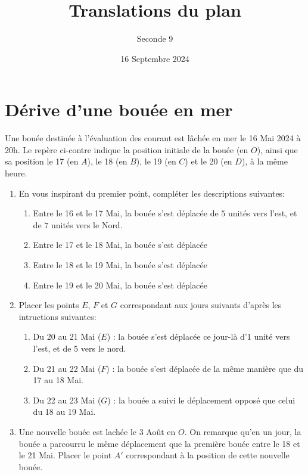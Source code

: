 \documentclass{article}
\title{Translations du plan}
\date{16 Septembre 2024}
\author{Seconde 9}
\begin{document}
\maketitle
\section*{Dérive d'une bouée en mer}
Une bouée destinée à l'évaluation des courant est lâchée en mer le 16 Mai 2024 à 20h. Le repère ci-contre indique la position initiale de la bouée (en $O$), ainsi que sa position le 17 (en $A$), le 18 (en $B$), le 19 (en $C$) et le 20 (en $D$), à la même heure. 
\begin{center}
\end{center}
\begin{enumerate}[label=\emph{\alph*)}]
\item En vous inspirant du premier point, compléter les descriptions suivantes:
\begin{enumerate}[label=\arabic*.]
\item Entre le 16 et le 17 Mai, la bouée s'est déplacée de $5$ unités vers l'est, et de $7$ unités vers le Nord.
\item Entre le 17 et le 18 Mai, la bouée s'est déplacée \answersline
\item Entre le 18 et le 19 Mai, la bouée s'est déplacée \answersline
\item Entre le 19 et le 20 Mai, la bouée s'est déplacée \answersline
\end{enumerate}
\item Placer les points $E$, $F$ et $G$ correspondant aux jours suivants d'après les intructions suivantes:
\begin{enumerate}[label=\arabic*.]
\item Du 20 au 21 Mai ($E$) : la bouée s'est déplacée ce jour-là d'$1$ unité vers l'est, et de $5$ vers le nord.
\item Du 21 au 22 Mai ($F$) : la bouée s'est déplacée de la même manière que du 17 au 18 Mai.
\item Du 22 au 23 Mai ($G$) : la bouée a suivi le déplacement opposé que celui du 18 au 19 Mai.
\end{enumerate}
\item Une nouvelle bouée est lachée le 3 Août en $O$. On remarque qu'en un jour, la bouée a parcourru le même déplacement que la première bouée entre le 18 et le 21 Mai. Placer le point $A'$ correspondant à la position de cette nouvelle bouée.
\end{enumerate}
\end{document}
